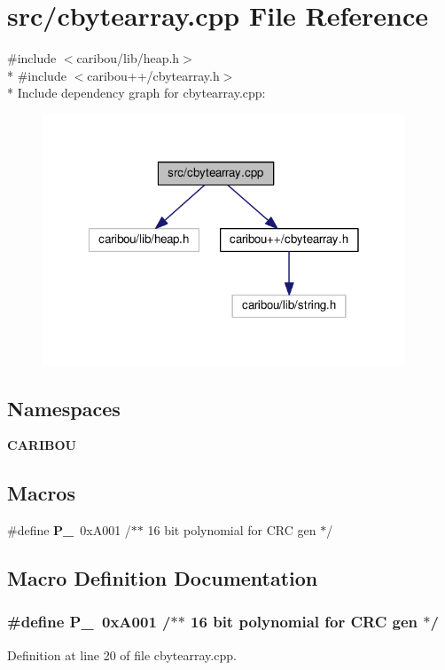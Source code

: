 \section{src/cbytearray.cpp File Reference}
\label{cbytearray_8cpp}
{\ttfamily \#include $<$caribou/lib/heap.\-h$>$}\\*
{\ttfamily \#include $<$caribou++/cbytearray.\-h$>$}\\*
Include dependency graph for cbytearray.\-cpp\-:\nopagebreak
\begin{figure}[H]
\begin{center}
\leavevmode
\includegraphics[width=307pt]{cbytearray_8cpp__incl}
\end{center}
\end{figure}
\subsection*{Namespaces}
\begin{DoxyCompactItemize}
\item 
{\bf C\-A\-R\-I\-B\-O\-U}
\end{DoxyCompactItemize}
\subsection*{Macros}
\begin{DoxyCompactItemize}
\item 
\#define {\bf P\-\_}~0x\-A001			/$\ast$$\ast$ 16 bit polynomial for C\-R\-C gen $\ast$/
\end{DoxyCompactItemize}


\subsection{Macro Definition Documentation}
\subsubsection[{P\-\_\-16}]{\setlength{\rightskip}{0pt plus 5cm}\#define P\-\_~0x\-A001			/$\ast$$\ast$ 16 bit polynomial for C\-R\-C gen $\ast$/}\label{cbytearray_8cpp_a5f2c80f23918438660a73b49507b3195}


Definition at line 20 of file cbytearray.\-cpp.

